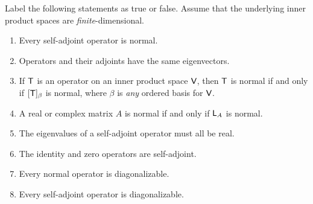 \exercisesection

\begin{exercise} \label{exercise 6.4.1}
Label the following statements as true or false.
Assume that the underlying inner product spaces are \emph{finite}-dimensional.
\begin{enumerate}
\item Every self-adjoint operator is normal.
\item Operators and their adjoints have the same eigenvectors.
\item If \(\textsf{T}\) is an operator on an inner product space \(\textsf{V}\), then \(\textsf{T}\) is normal if and only if \([\textsf{T}]_{\beta}\) is normal, where \(\beta\) is \emph{any} ordered basis for \(\textsf{V}\).
\item A real or complex matrix \(A\) is normal if and only if \(\textsf{L}_A\) is normal.
\item The eigenvalues of a self-adjoint operator must all be real.
\item The identity and zero operators are self-adjoint.
\item Every normal operator is diagonalizable.
\item Every self-adjoint operator is diagonalizable.
\end{enumerate}
\end{exercise}

